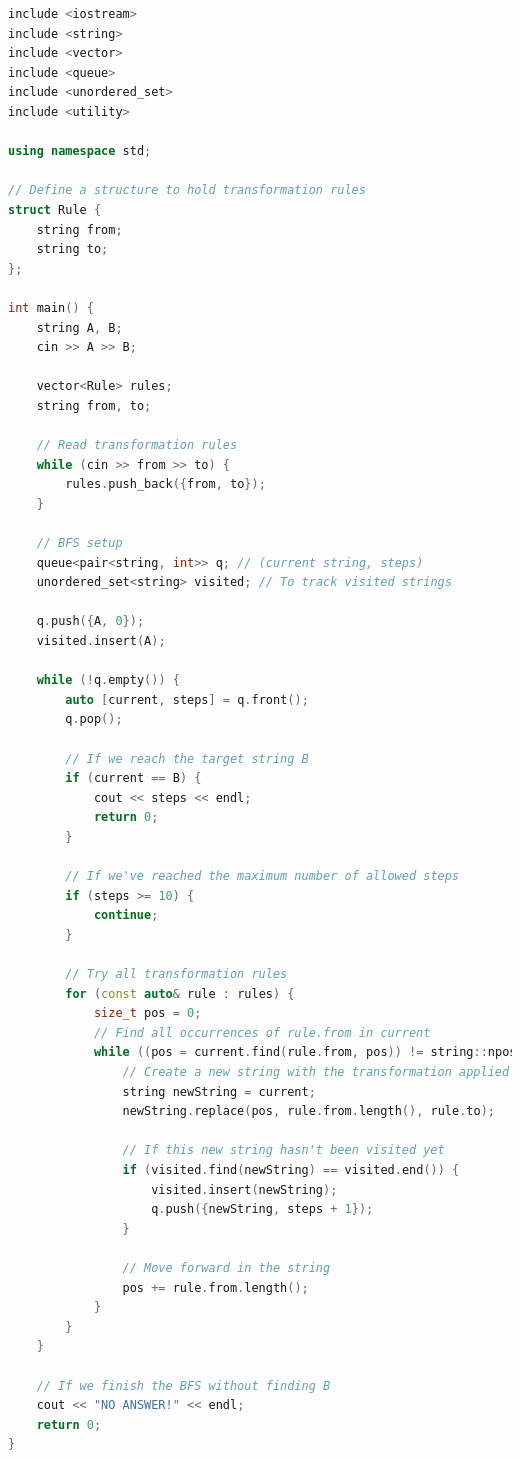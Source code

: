 \documentclass[12pt,twiside,a4paper]{ctexbook}
\numberwithin{chapter}{part}
\begin{document}
\begin{lstlisting}[language=c++,breaklines=true]
include <iostream>
include <string>
include <vector>
include <queue>
include <unordered_set>
include <utility>

using namespace std;

// Define a structure to hold transformation rules
struct Rule {
    string from;
    string to;
};

int main() {
    string A, B;
    cin >> A >> B;

    vector<Rule> rules;
    string from, to;

    // Read transformation rules
    while (cin >> from >> to) {
        rules.push_back({from, to});
    }

    // BFS setup
    queue<pair<string, int>> q; // (current string, steps)
    unordered_set<string> visited; // To track visited strings

    q.push({A, 0});
    visited.insert(A);

    while (!q.empty()) {
        auto [current, steps] = q.front();
        q.pop();

        // If we reach the target string B
        if (current == B) {
            cout << steps << endl;
            return 0;
        }

        // If we've reached the maximum number of allowed steps
        if (steps >= 10) {
            continue;
        }

        // Try all transformation rules
        for (const auto& rule : rules) {
            size_t pos = 0;
            // Find all occurrences of rule.from in current
            while ((pos = current.find(rule.from, pos)) != string::npos) {
                // Create a new string with the transformation applied
                string newString = current;
                newString.replace(pos, rule.from.length(), rule.to);

                // If this new string hasn't been visited yet
                if (visited.find(newString) == visited.end()) {
                    visited.insert(newString);
                    q.push({newString, steps + 1});
                }

                // Move forward in the string
                pos += rule.from.length();
            }
        }
    }

    // If we finish the BFS without finding B
    cout << "NO ANSWER!" << endl;
    return 0;
}
\end{lstlisting}
\end{document}
